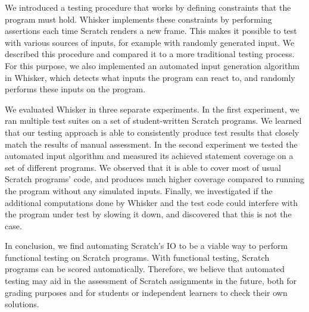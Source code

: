 We introduced a testing procedure that works by defining constraints that the program must hold.
Whisker implements these constraints by performing assertions each time Scratch renders a new frame.
This makes it possible to test with various sources of inputs, for example with randomly generated input.
We described this procedure and compared it to a more traditional testing process.
For this purpose, we also implemented an automated input generation algorithm in Whisker,
which detects what inputs the program can react to, and randomly performs these inputs on the program.
\parspace

We evaluated Whisker in three separate experiments.
In the first experiment, we ran multiple test suites on a set of student-written Scratch programs.
We learned that our testing approach is able to consistently produce test results that closely match the results of manual assessment.
In the second experiment we tested the automated input algorithm and measured its achieved statement coverage
on a set of different programs.
We observed that it is able to cover most of usual Scratch programs' code,
and produces much higher coverage compared to running the program without any simulated inputs.
Finally, we investigated if the additional computations done by Whisker and the test code could interfere with the program
under test by slowing it down, and discovered that this is not the case.
\parspace


In conclusion, we find automating Scratch's IO to be a viable way to perform functional testing on Scratch programs.
With functional testing, Scratch programs can be scored automatically.
Therefore, we believe that automated testing may aid in the assessment of Scratch assignments in the future,
both for grading purposes and for students or independent learners to check their own solutions.
